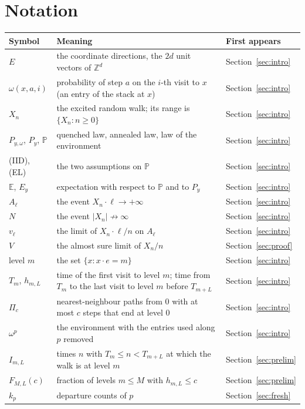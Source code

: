 \documentclass[11pt]{amsart}
\theoremstyle{remark}
\newcommand{\Z}{\mathbb{Z}}
\newcommand{\E}{\mathbb{E}}
\newcommand{\Prob}{\mathbb{P}}
\begin{document}
\appendix
\section{Notation}\label{app:notation}
\begin{center}
\small
\begin{tabular}{@{}lp{}l@{}}
\toprule
Symbol & Meaning & First appears\\
\midrule
$E$ & the coordinate directions, the $2d$ unit vectors of $\Z^d$ & Section~\ref{sec:intro}\\
$\omega(x,a,i)$ & probability of step $a$ on the $i$-th visit to $x$ (an entry of the stack at $x$) & Section~\ref{sec:intro}\\
$X_n$ & the excited random walk; its range is $\{X_n:n\ge0\}$ & Section~\ref{sec:intro}\\
$P_{y,\omega}$, $P_y$, $\Prob$ & quenched law, annealed law, law of the environment & Section~\ref{sec:intro}\\
(IID), (EL) & the two assumptions on $\Prob$ & Section~\ref{sec:intro}\\
$\E$, $E_y$ & expectation with respect to $\Prob$ and to $P_y$ & Section~\ref{sec:intro}\\
$A_\ell$ & the event $X_n\cdot\ell\to+\infty$ & Section~\ref{sec:intro}\\
$N$ & the event $|X_n|\not\to\infty$ & Section~\ref{sec:intro}\\
$v_\ell$ & the limit of $X_n\cdot\ell/n$ on $A_\ell$ & Section~\ref{sec:intro}\\
$V$ & the almost sure limit of $X_n/n$ & Section~\ref{sec:proof}\\
level $m$ & the set $\{x:x\cdot e=m\}$ & Section~\ref{sec:intro}\\
$T_m$, $h_{m,L}$ & time of the first visit to level $m$; time from $T_m$ to the last visit to level $m$ before $T_{m+L}$ & Section~\ref{sec:intro}\\
$\Pi_c$ & nearest-neighbour paths from $0$ with at most $c$ steps that end at level $0$ & Section~\ref{sec:intro}\\
$\omega^p$ & the environment with the entries used along $p$ removed & Section~\ref{sec:intro}\\
$I_{m,L}$ & times $n$ with $T_m\le n<T_{m+L}$ at which the walk is at level $m$ & Section~\ref{sec:prelim}\\
$F_{M,L}(c)$ & fraction of levels $m\le M$ with $h_{m,L}\le c$ & Section~\ref{sec:prelim}\\
$k_p$ & departure counts of $p$ & Section~\ref{sec:fresh}\\

\end{tabular}
\end{center}
\end{document}

